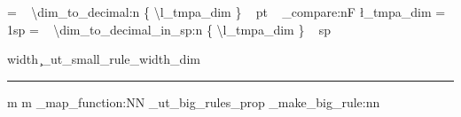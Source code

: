 {{{\begin{minipage} [ t ] { \l_tmpb_dim }
{{                   = ~ \SI { \dim_to_decimal:n { \l_tmpa_dim } } { pt } ~
               }
               \dim_compare:nF { \l_tmpa_dim = 1sp } {
                   = ~ \SI { \dim_to_decimal_in_sp:n { \l_tmpa_dim } } { sp }
               }
         }
         \par \vspace{ \c_ut_inner_sep_dim }
      \end{minipage}
      \hspace { \c_ut_inner_sep_dim }
       {
         { \color { l_ut_fill_color ! 26 } \vrule width \c_ut_small_rule_width_dim }
         \hspace { -\c_ut_small_rule_width_dim }
         \color { l_ut_fill_color }
         \rule
            [ \dim_eval:n { -\l_tmpa_dim + \c_ut_inner_sep_dim } ]
            { \c_ut_small_rule_width_dim }
            { \l_tmpa_dim }
      }
   }%
} }
\NewDocumentCommand { \DrawRule } { m m } {
   \hspace  { -\c_ut_big_rule_box_width_dim }
}
\NewDocumentCommand{ \DrawRules } {  } {
   \prop_map_function:NN \g_ut_big_rules_prop \ut_make_big_rule:nn
}

\ExplSyntaxOff%